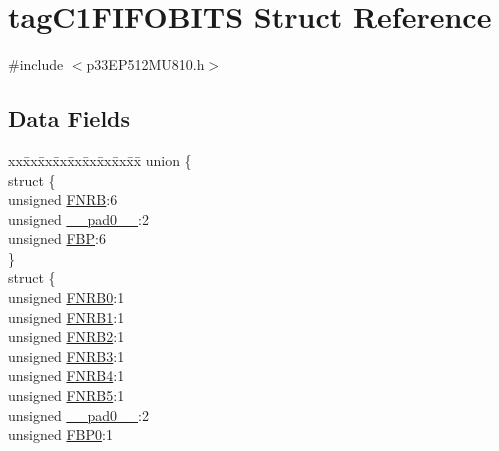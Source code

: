 \hypertarget{structtag_c1_f_i_f_o_b_i_t_s}{}\section{tag\+C1\+F\+I\+F\+O\+B\+I\+TS Struct Reference}
\label{structtag_c1_f_i_f_o_b_i_t_s}


{\ttfamily \#include $<$p33\+E\+P512\+M\+U810.\+h$>$}

\subsection*{Data Fields}
\begin{DoxyCompactItemize}
\item 
\begin{tabbing}
xx\=xx\=xx\=xx\=xx\=xx\=xx\=xx\=xx\=\kill
union \{\\
\>struct \{\\
\>\>unsigned \hyperlink{structtag_c1_f_i_f_o_b_i_t_s_a5133b0d0aae683d45a3af2028cc2bb4c}{FNRB}:6\\
\>\>unsigned \hyperlink{structtag_c1_f_i_f_o_b_i_t_s_adf71f3d8410c1f1dbbc96680a92c49af}{\_\_pad0\_\_}:2\\
\>\>unsigned \hyperlink{structtag_c1_f_i_f_o_b_i_t_s_a4bc01b2787e9b74bafc9a88e857924ff}{FBP}:6\\
\>\} \\
\>struct \{\\
\>\>unsigned \hyperlink{structtag_c1_f_i_f_o_b_i_t_s_ae66d44fcce0537281054f582268ccead}{FNRB0}:1\\
\>\>unsigned \hyperlink{structtag_c1_f_i_f_o_b_i_t_s_a115f782923b0fecb2a15a36397104ccb}{FNRB1}:1\\
\>\>unsigned \hyperlink{structtag_c1_f_i_f_o_b_i_t_s_a8bb0f7fb84c76708069eeb48a24a5d61}{FNRB2}:1\\
\>\>unsigned \hyperlink{structtag_c1_f_i_f_o_b_i_t_s_ab20b55838f7bd8b39c2c9b04de83ef34}{FNRB3}:1\\
\>\>unsigned \hyperlink{structtag_c1_f_i_f_o_b_i_t_s_a9095fcba1d93ad672ea64cf1cb2c0e71}{FNRB4}:1\\
\>\>unsigned \hyperlink{structtag_c1_f_i_f_o_b_i_t_s_a5397efb64ea26a685f138eeda891a3b6}{FNRB5}:1\\
\>\>unsigned \hyperlink{structtag_c1_f_i_f_o_b_i_t_s_adf71f3d8410c1f1dbbc96680a92c49af}{\_\_pad0\_\_}:2\\
\>\>unsigned \hyperlink{structtag_c1_f_i_f_o_b_i_t_s_a5e3a60193e141e6d442e85799299c1f5}{FBP0}:1\\

\end{tabbing}
\end{DoxyCompactItemize}

